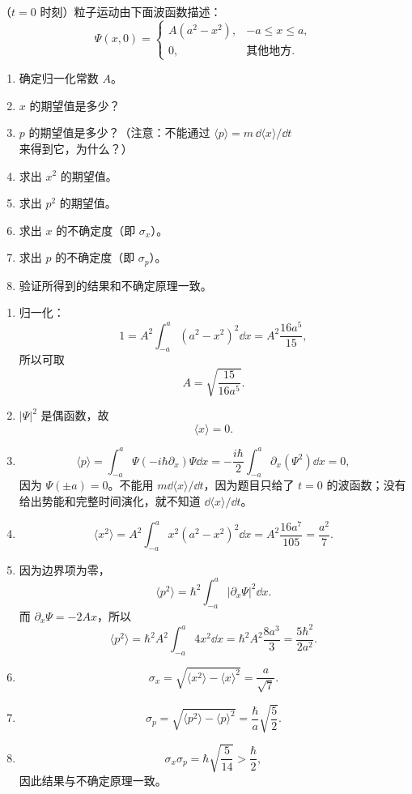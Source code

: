 \begin{question}
（$t=0$ 时刻）粒子运动由下面波函数描述：
\[
\Psi(x,0)=
\begin{cases}
A(a^2-x^2), & -a\le x\le a,\\
0, & \text{其他地方}.
\end{cases}
\]
\begin{enumerate}
\item 确定归一化常数 $A$。
\item $x$ 的期望值是多少？
\item $p$ 的期望值是多少？（注意：不能通过 $\langle p\rangle=m\,\dd\langle x\rangle/\dd t$ 来得到它，为什么？）
\item 求出 $x^2$ 的期望值。
\item 求出 $p^2$ 的期望值。
\item 求出 $x$ 的不确定度（即 $\sigma_x$）。
\item 求出 $p$ 的不确定度（即 $\sigma_p$）。
\item 验证所得到的结果和不确定原理一致。
\end{enumerate}
\end{question}
\begin{solution}
\begin{enumerate}
\item 归一化：
\[
1=A^2\int_{-a}^{a}(a^2-x^2)^2\dd x
=A^2\frac{16a^5}{15},
\]
所以可取
\[
A=\sqrt{\frac{15}{16a^5}}.
\]
\item $|\Psi|^2$ 是偶函数，故
\[
\langle x\rangle=0.
\]
\item
\[
\langle p\rangle=\int_{-a}^a\Psi(-i\hbar\partial_x)\Psi\dd x
=-\frac{i\hbar}{2}\int_{-a}^a\partial_x(\Psi^2)\dd x=0,
\]
因为 $\Psi(\pm a)=0$。不能用 $m\dd\langle x\rangle/\dd t$，因为题目只给了 $t=0$ 的波函数；没有给出势能和完整时间演化，就不知道 $\dd\langle x\rangle/\dd t$。
\item
\[
\langle x^2\rangle=A^2\int_{-a}^{a}x^2(a^2-x^2)^2\dd x
=A^2\frac{16a^7}{105}=\frac{a^2}{7}.
\]
\item 因为边界项为零，
\[
\langle p^2\rangle=\hbar^2\int_{-a}^{a}|\partial_x\Psi|^2\dd x.
\]
而 $\partial_x\Psi=-2Ax$，所以
\[
\langle p^2\rangle=\hbar^2 A^2\int_{-a}^{a}4x^2\dd x
=\hbar^2A^2\frac{8a^3}{3}=\frac{5\hbar^2}{2a^2}.
\]
\item
\[
\sigma_x=\sqrt{\langle x^2\rangle-\langle x\rangle^2}=\frac{a}{\sqrt7}.
\]
\item
\[
\sigma_p=\sqrt{\langle p^2\rangle-\langle p\rangle^2}=\frac{\hbar}{a}\sqrt{\frac52}.
\]
\item
\[
\sigma_x\sigma_p=\hbar\sqrt{\frac{5}{14}}>\frac{\hbar}{2},
\]
因此结果与不确定原理一致。
\end{enumerate}
\end{solution}

